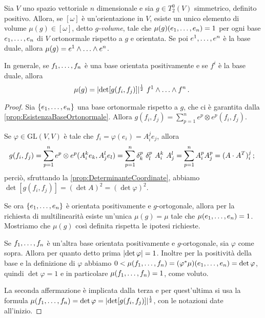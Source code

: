 \begin{proposition} %
	Sia $V$ uno spazio vettoriale $n$ dimensionale e sia $g\in T^0_2(V)$ simmetrico, definito positivo. Allora, se $[\omega]$ è un'orientazione in $V$, esiste un unico elemento di volume $\mu(g) \in [\omega]$, detto \emph{$g$-volume}, tale che $\mu(g)(\seqb en,) = 1$ per ogni base $\seqb en,$ di $V$ ortonormale rispetto a $g$ e orientata.
	Se poi $\seqa en,$ è la base duale, allora $\mu(g) = \seqa en\wedge$.
	
	In generale, se $\seqb fn,$ è una base orientata positivamente e se $f^i$ è la base duale, allora
	\begin{equation*}
		\mu(g) = \abs{ \det[g(f_i,f_j)] }^{\frac 12}\ \seqa fn\wedge \punto
	\end{equation*}
\end{proposition}
\begin{proof}
	Sia $\{\seqb en,\}$ una base ortonormale rispetto a $g$, che ci è garantita dalla \cref{prop:EsistenzaBaseOrtonormale}. Allora $g(f_i,f_j) = \sum_{p=1}^n e^p\otimes e^p (f_i,f_j)$.
	
	Se $\varphi \in \mathrm{GL}(V,V)$ è tale che $f_i = \varphi(e_i) = A_i^je_j$, allora
	\begin{equation*}
	g(f_i,f_j) = \sum_{p=1}^n e^p\otimes e^p (A_i^k e_k, A_j^le_l) = \sum_{p=1}^n \delta_k^p\ \delta_l^p\ A_i^k\ A_j^l = \sum_{p=1}^nA_i^pA_j^p = (A \cdot A^T)_i^j\puntovirgola
	\end{equation*}
	perciò, sfruttando la \cref{prop:DeterminanteCoordinate}, abbiamo $\det[g(f_i,f_j)] = (\det A)^2 = (\det\varphi)^2$.
	
	Se ora $\{\seqb en,\}$ è orientata positivamente e $g$-ortogonale, allora per la richiesta di multilinearità esiste un'unica $\mu(g)=\mu$ tale che $\mu(\seqb en,) = 1$. Mostriamo che $\mu(g)$ così definita rispetta le ipotesi richieste.
	
	Se $\seqb fn,$ è un'altra base orientata positivamente e $g$-ortogonale, sia $\varphi$ come sopra. Allora per quanto detto prima $\abs{\det\varphi} = 1$. Inoltre per la positività della base e la definizione di $\varphi$ abbiamo $0<\mu(\seqb fn,) = (\varphi^*\mu)(\seqb en,) = \det\varphi$, quindi $\det\varphi=1$ e in particolare $\mu(\seqb fn,)=1$, come voluto.
	
	La seconda affermazione è implicata dalla terza e per quest'ultima si usa la formula $\mu(\seqb fn,) = \det\varphi = \abs{ \det[g(f_i,f_j)] }^\frac 12$, con le notazioni date all'inizio.
\end{proof}

